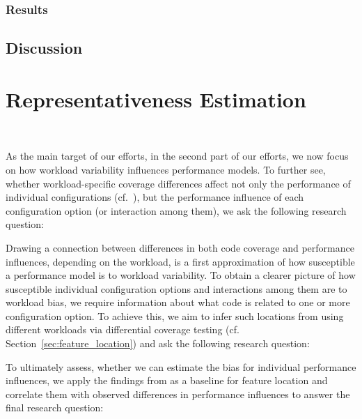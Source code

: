 \subsubsection{Results}

\subsection{Discussion}

\section{Representativeness Estimation}~\label{sec:metric}

As the main target of our efforts, in the second part of our efforts, we now focus on how workload variability influences performance models. To further see, whether workload-specific coverage differences affect not only the performance of individual configurations (cf.~), but the performance influence of each configuration option (or interaction among them), we ask the following research question:




Drawing a connection between differences in both code coverage and performance influences, depending on the workload, is a first approximation of how susceptible a performance model is to workload variability. To obtain a clearer picture of how susceptible individual configuration options and interactions among them are to workload bias, we require information about what code is related to one or more configuration option. To achieve this, we aim to infer such locations from using different workloads via differential coverage testing (cf. Section~\ref{sec:feature_location}) and ask the following research question:


To ultimately assess, whether we can estimate the bias for individual performance influences, we apply the findings from  as a baseline for feature location and correlate them with observed differences in performance influences to answer the final research question:


